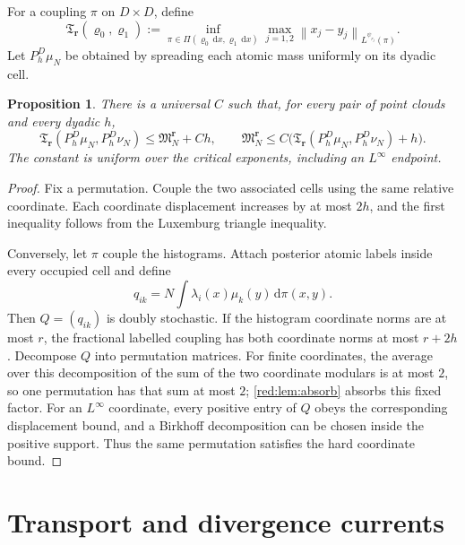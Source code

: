 \documentclass[11pt]{article}
\newtheorem{proposition}[proposition]{Proposition}
\theoremstyle{definition}
\theoremstyle{remark}
\numberwithin{equation}{section}
\newcommand{\norm}[1]{\left\|#1\right\|}
\newcommand{\dd}{\,\mathrm d}
\begin{document}
For a coupling $\pi$ on $D\times D$, define
\begin{equation}
 \mathfrak T_{\boldsymbol r}(\varrho_0,\varrho_1)
 :=\inf_{\pi\in\Pi(\varrho_0\dd x,\varrho_1\dd x)}
 \max_{j=1,2}\norm{x_j-y_j}_{L^{\psi_{r_j}}(\pi)}.
 \label{red:eq:aniso-transport-gauge}
\end{equation}
Let $P_h^D\mu_N$ be obtained by spreading each atomic mass uniformly on its
dyadic cell.

\begin{proposition}
\label{red:prop:atomic-hist}
There is a universal $C$ such that, for every pair of point clouds and every
dyadic $h$,
\begin{equation}
 \mathfrak T_{\boldsymbol r}(P_h^D\mu_N,P_h^D\nu_N)
 \le \mathfrak M_N^{\boldsymbol r}+Ch,
 \qquad
 \mathfrak M_N^{\boldsymbol r}
 \le C\bigl(\mathfrak T_{\boldsymbol r}(P_h^D\mu_N,P_h^D\nu_N)+h\bigr).
 \label{red:eq:atomic-hist-equivalence}
\end{equation}
The constant is uniform over the critical exponents, including an
$L^\infty$ endpoint.
\end{proposition}

\begin{proof}
Fix a permutation.  Couple the two associated cells using the same relative
coordinate.  Each coordinate displacement increases by at most $2h$, and
the first inequality follows from the Luxemburg triangle inequality.

Conversely, let $\pi$ couple the histograms.  Attach posterior atomic labels
inside every occupied cell and define
\[
 q_{ik}=N\int\lambda_i(x)\mu_k(y)\dd\pi(x,y).
\]
Then $Q=(q_{ik})$ is doubly stochastic.  If the histogram coordinate norms
are at most $r$, the fractional labelled coupling has both coordinate norms
at most $r+2h$.  Decompose $Q$ into permutation matrices.  For finite
coordinates, the average over this decomposition of the sum of the two
coordinate modulars is at most $2$, so one permutation has that sum at most
$2$; \cref{red:lem:absorb} absorbs this fixed factor.  For an $L^\infty$
coordinate, every positive entry of $Q$ obeys the corresponding displacement
bound, and a Birkhoff decomposition can be chosen inside the positive
support.  Thus the same permutation satisfies the hard coordinate bound.
\end{proof}

\section{Transport and divergence currents}
\end{document}
